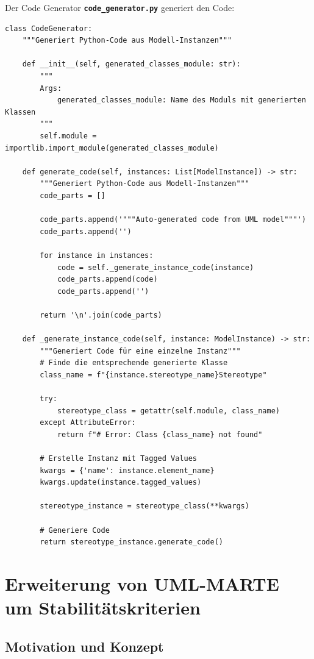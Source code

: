 ﻿\documentclass[a4paper,12pt]{report}
\theoremstyle{definition}
\begin{document}
Der Code Generator \texttt{\textbf{code\_generator.py}} generiert den Code:
\begin{lstlisting}[style=python, caption={ProfileParser Implementierung}, label={lst:profile-parser2}]
class CodeGenerator:
    """Generiert Python-Code aus Modell-Instanzen"""
    
    def __init__(self, generated_classes_module: str):
        """
        Args:
            generated_classes_module: Name des Moduls mit generierten Klassen
        """
        self.module = importlib.import_module(generated_classes_module)
    
    def generate_code(self, instances: List[ModelInstance]) -> str:
        """Generiert Python-Code aus Modell-Instanzen"""
        code_parts = []
        
        code_parts.append('"""Auto-generated code from UML model"""')
        code_parts.append('')
        
        for instance in instances:
            code = self._generate_instance_code(instance)
            code_parts.append(code)
            code_parts.append('')
        
        return '\n'.join(code_parts)
    
    def _generate_instance_code(self, instance: ModelInstance) -> str:
        """Generiert Code für eine einzelne Instanz"""
        # Finde die entsprechende generierte Klasse
        class_name = f"{instance.stereotype_name}Stereotype"
        
        try:
            stereotype_class = getattr(self.module, class_name)
        except AttributeError:
            return f"# Error: Class {class_name} not found"
        
        # Erstelle Instanz mit Tagged Values
        kwargs = {'name': instance.element_name}
        kwargs.update(instance.tagged_values)
        
        stereotype_instance = stereotype_class(**kwargs)
        
        # Generiere Code
        return stereotype_instance.generate_code()
\end{lstlisting}

\section{Erweiterung von UML-MARTE um Stabilitätskriterien}
\label{sec:marte-stability}

\subsection{Motivation und Konzept}
\end{document}
